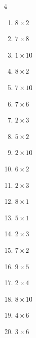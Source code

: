 \begin{multicols}{4}
\begin{enumerate}
  \item $8\times 2$
        \phantom{$=16$}

  \item $7\times 8$
        \phantom{$=56$}

  \item $1\times 10$
        \phantom{$=10$}

  \item $8\times 2$
        \phantom{$=16$}

  \item $7\times 10$
        \phantom{$=70$}

  \item $7\times 6$
        \phantom{$=42$}

  \item $2\times 3$
        \phantom{$=6$}

  \item $5\times 2$
        \phantom{$=10$}

  \item $2\times 10$
        \phantom{$=20$}

  \item $6\times 2$
        \phantom{$=12$}

  \item $2\times 3$
        \phantom{$=6$}

  \item $8\times 1$
        \phantom{$=8$}

  \item $5\times 1$
        \phantom{$=5$}

  \item $2\times 3$
        \phantom{$=6$}

  \item $7\times 2$
        \phantom{$=14$}

  \item $9\times 5$
        \phantom{$=45$}

  \item $2\times 4$
        \phantom{$=8$}

  \item $8\times 10$
        \phantom{$=80$}

  \item $4\times 6$
        \phantom{$=24$}

  \item $3\times 6$
        \phantom{$=18$}

\columnbreak %

\resetques


\end{enumerate}
\end{multicols}
